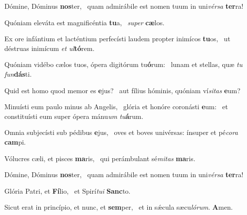 \item Dómine, Dóminus \textbf{nos}ter,~\psstar{} quam admirábile est nomen tuum in uni\textit{vérsa} \textbf{ter}ra!
\item Quóniam eleváta est magnificéntia \textbf{tu}a,~\psstar{} \textit{super} \textbf{cæ}los.
\item Ex ore infántium et lacténtium perfecísti laudem propter inimícos \textbf{tu}os,~\psstar{} ut déstruas inimícum \textit{et} \textit{ul}\textbf{tó}rem.
\item Quóniam vidébo cælos tuos, ópera digitórum tu\textbf{ó}rum:~\psstar{} lunam et stellas, quæ \textit{tu} \textit{fun}\textbf{dás}ti.
\item Quid est homo quod memor es \textbf{e}jus?~\psstar{} aut fílius hóminis, quóniam ví\textit{sitas} \textbf{e}um?
\item Minuísti eum paulo minus ab Angelis,~\pscross{} glória et honóre coronásti \textbf{e}um:~\psstar{} et constituísti eum super ópera mánu\textit{um} \textit{tu}\textbf{á}rum.
\item Omnia subjecísti sub pédibus \textbf{e}jus,~\psstar{} oves et boves univérsas: ínsuper et pé\textit{cora} \textbf{cam}pi.
\item Vólucres cæli, et pisces \textbf{ma}ris,~\psstar{} qui perámbulant sé\textit{mitas} \textbf{ma}ris.
\item Dómine, Dóminus \textbf{nos}ter,~\psstar{} quam admirábile est nomen tuum in uni\textit{vérsa} \textbf{ter}ra!
\item Glória Patri, et \textbf{Fí}lio,~\psstar{} et Spirí\textit{tui} \textbf{Sanc}to.
\item Sicut erat in princípio, et nunc, et \textbf{sem}per,~\psstar{} et in sǽcula sæcu\textit{lórum}. \textbf{A}men.

